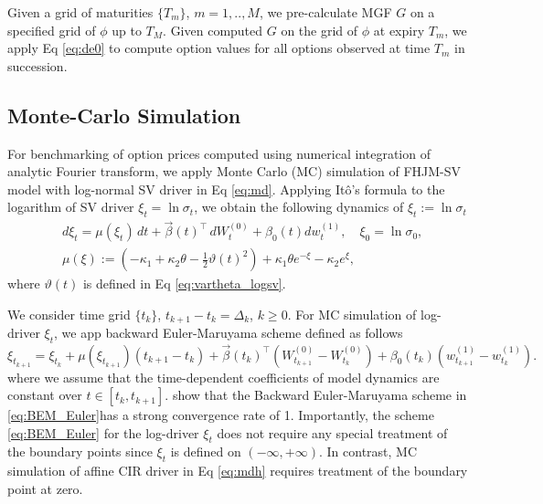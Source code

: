 \documentclass[pdftex,11pt,a4paper] {article}
\begin{document}
Given a grid of maturities $\{T_{m}\}$, $m=1,..,M$, we pre-calculate MGF $G$ on a specified grid of $\phi$ up to $T_{M}$.  Given computed $G$ on the grid of $\phi$ at expiry $T_{m}$, we apply Eq \eqref{eq:de0} to compute option values for all options observed at time $T_{m}$ in succession.



\subsection{Monte-Carlo Simulation}
For benchmarking of option prices computed using numerical integration of analytic Fourier transform, we apply Monte Carlo (MC) simulation of FHJM-SV model with log-normal SV driver in Eq \eqref{eq:md}. Applying It\^{o}'s formula to the logarithm of SV driver $\xi_t=\ln\sigma_t$, we obtain the following dynamics of $\xi_t:=\ln\sigma_t$ 
\begin{equation*}
\begin{split}
&d\xi_t=\mu(\xi_t)\,dt+\vec{\beta}(t)^\top\,dW^{(0)}_t+\beta_{0}(t)dw^{(1)}_t,\quad \xi_0=\ln \sigma_0,\\
&\mu(\xi):=\left(-\kappa_1+\kappa_2\theta-\frac{1}{2}\vartheta(t)^2\right)+\kappa_1\theta e^{-\xi}-\kappa_2e^{\xi},
\end{split}
\end{equation*}
where $\vartheta(t)$ is defined in Eq \eqref{eq:vartheta_logsv}. 

We consider time grid $\{t_k\}$, $t_{k+1}-t_k=\Delta_k$, $k\ge 0$. For MC simulation of log-driver $\xi_t$, we app backward Euler-Maruyama scheme defined as follows
\begin{equation}\label{eq:BEM_Euler}
\xi_{t_{k+1}}=\xi_{t_{k}}+\mu\left(\xi_{t_{k+1}}\right)\left(t_{k+1}-t_k\right)+\vec\beta(t_k)^\top \left(W^{(0)}_{t_{k+1}}-W^{(0)}_{t_{k}}\right)+\beta_0(t_k)\left(w^{(1)}_{t_{k+1}}-w^{(1)}_{t_{k}}\right).
\end{equation}
where we assume that the time-dependent coefficients of model dynamics are constant over $t\in [t_k,t_{k+1}]$. \cite{Sepp2024} show that the Backward Euler-Maruyama scheme in \eqref{eq:BEM_Euler}has a strong convergence rate of 1. Importantly, the scheme \eqref{eq:BEM_Euler} for the log-driver $\xi_t$ does not require any special treatment of the boundary points since $\xi_t$ is defined on $(-\infty,+\infty)$. In contrast, MC simulation of affine CIR driver in Eq \eqref{eq:mdh} requires treatment of the boundary point at zero.
\end{document}

